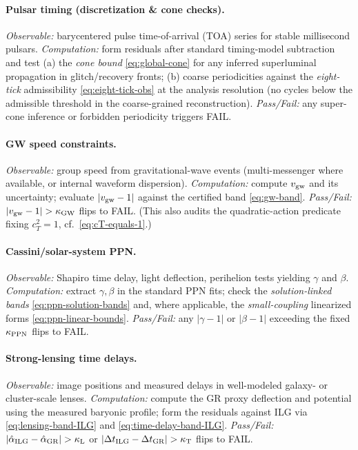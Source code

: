 \documentclass[12pt,a4paper]{article}
\begin{document}
\paragraph{Pulsar timing (discretization \& cone checks).}
\emph{Observable:} barycentered pulse time-of-arrival (TOA) series for stable millisecond pulsars. 
\emph{Computation:} form residuals after standard timing-model subtraction and test (a) the \emph{cone bound} \eqref{eq:global-cone} for any inferred superluminal propagation in glitch/recovery fronts; (b) coarse periodicities against the \emph{eight-tick} admissibility \eqref{eq:eight-tick-obs} at the analysis resolution (no cycles below the admissible threshold in the coarse-grained reconstruction).
\emph{Pass/Fail:} any super-cone inference or forbidden periodicity triggers \textsc{FAIL}.

\paragraph{GW speed constraints.}
\emph{Observable:} group speed from gravitational-wave events (multi-messenger where available, or internal waveform dispersion). 
\emph{Computation:} compute \(v_{\rm gw}\) and its uncertainty; evaluate \(|v_{\rm gw}-1|\) against the certified band \eqref{eq:gw-band}. 
\emph{Pass/Fail:} \(|v_{\rm gw}-1|>\kappa_{\rm GW}\) flips to \textsc{FAIL}. (This also audits the quadratic-action predicate fixing \(c_T^2=1\), cf.\ \eqref{eq:cT-equals-1}.)

\paragraph{Cassini/solar-system PPN.}
\emph{Observable:} Shapiro time delay, light deflection, perihelion tests yielding \(\gamma\) and \(\beta\).
\emph{Computation:} extract \(\gamma,\beta\) in the standard PPN fits; check the \emph{solution-linked bands} \eqref{eq:ppn-solution-bands} and, where applicable, the \emph{small-coupling} linearized forms \eqref{eq:ppn-linear-bounds}.
\emph{Pass/Fail:} any \(|\gamma-1|\) or \(|\beta-1|\) exceeding the fixed \(\kappa_{\rm PPN}\) flips to \textsc{FAIL}.

\paragraph{Strong-lensing time delays.}
\emph{Observable:} image positions and measured delays in well-modeled galaxy- or cluster-scale lenses. 
\emph{Computation:} compute the GR proxy deflection and potential using the measured baryonic profile; form the residuals against ILG via \eqref{eq:lensing-band-ILG} and \eqref{eq:time-delay-band-ILG}. 
\emph{Pass/Fail:} \(|\hat\alpha_{\rm ILG}-\hat\alpha_{\rm GR}|>\kappa_{\rm L}\) or \(|\Delta t_{\rm ILG}-\Delta t_{\rm GR}|>\kappa_{\rm T}\) flips to \textsc{FAIL}.
\end{document}
